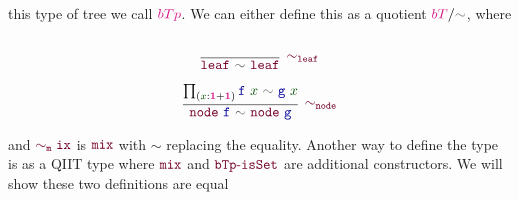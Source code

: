\documentclass[twoside,11pt,openright]{report}
\theoremstyle{plain} %
\theoremstyle{definition}
\theoremstyle{remark}
\newcommand*{\term}[1]{\textcolor{green!30!black}{#1}} %
\newcommand*{\type}[1]{\textcolor{magenta!90!black}{#1}}
\newcommand*{\unit}{\type{\textbf{1}}}
\newcommand*{\relation}[1]{\textcolor{gray!75!black}{\ensuremath{\mathtt{#1}}}}
\newcommand*{\function}[1]{\textcolor{blue!60!black}{\ensuremath{\mathtt{#1}}}}
\newcommand*{\constructor}[1]{\textcolor{purple!60!black}{\ensuremath{\mathtt{#1}}}}
\begin{document}
this type of tree we call  \(\type{bTp}\). We can either define this as a quotient \(\type{bT} / \relation{\sim}\), where
\begin{center}
  \strut
  \hfill
  \begin{minipage}{0.3\linewidth}
    \begin{equation}
      \vcenter{\infer[\constructor{\sim_{leaf}}]{\constructor{leaf}~\relation{\sim}~\constructor{leaf}}{\strut}}
    \end{equation}
  \end{minipage}
  \hfill
  \begin{minipage}{0.35\linewidth}
    \begin{equation}
      \vcenter{\infer[\constructor{\sim_{node}}]{\constructor{node}~\function{f}~\relation{\sim}~\constructor{node}~\function{g}}{\prod_{(\term{x} : \unit + \unit)} \function{f}~\term{x}~\relation{\sim}~\function{g}~\term{x}}}
    \end{equation}
  \end{minipage}
  \hfill
  \strut
\end{center}
and \(\constructor{\sim_mix}\) is \(\constructor{mix}\) with \(\sim\) replacing the equality. Another way to define the type is as a QIIT type where \(\constructor{mix}\) and \(\constructor{bTp\text{-}isSet}\) are additional constructors. We will show these two definitions are equal
\end{document}
